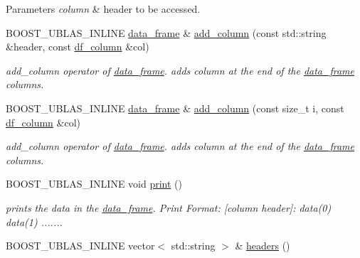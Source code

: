 \begin{DoxyParams}{Parameters}
{\em column} & header to be accessed. \\
\hline
\end{DoxyParams}
\begin{DoxyCompactItemize}
\item 
B\+O\+O\+S\+T\+\_\+\+U\+B\+L\+A\+S\+\_\+\+I\+N\+L\+I\+NE \hyperlink{classboost_1_1numeric_1_1ublas_1_1data__frame}{data\+\_\+frame} \& \hyperlink{classboost_1_1numeric_1_1ublas_1_1data__frame_a8f67aa27f8f340e8bfd42ce0f7713be0}{add\+\_\+column} (const std\+::string \&header, const \hyperlink{classboost_1_1numeric_1_1ublas_1_1df__column}{df\+\_\+column} \&col)
\begin{DoxyCompactList}\small\item\em add\+\_\+column operator of \hyperlink{classboost_1_1numeric_1_1ublas_1_1data__frame}{data\+\_\+frame}. adds column at the end of the \hyperlink{classboost_1_1numeric_1_1ublas_1_1data__frame}{data\+\_\+frame} columns. \end{DoxyCompactList}\item 
B\+O\+O\+S\+T\+\_\+\+U\+B\+L\+A\+S\+\_\+\+I\+N\+L\+I\+NE \hyperlink{classboost_1_1numeric_1_1ublas_1_1data__frame}{data\+\_\+frame} \& \hyperlink{classboost_1_1numeric_1_1ublas_1_1data__frame_a487209ed44384e2999d6a407160276e6}{add\+\_\+column} (const size\+\_\+t i, const \hyperlink{classboost_1_1numeric_1_1ublas_1_1df__column}{df\+\_\+column} \&col)
\begin{DoxyCompactList}\small\item\em add\+\_\+column operator of \hyperlink{classboost_1_1numeric_1_1ublas_1_1data__frame}{data\+\_\+frame}. adds column at the end of the \hyperlink{classboost_1_1numeric_1_1ublas_1_1data__frame}{data\+\_\+frame} columns. \end{DoxyCompactList}\item 
B\+O\+O\+S\+T\+\_\+\+U\+B\+L\+A\+S\+\_\+\+I\+N\+L\+I\+NE void \hyperlink{classboost_1_1numeric_1_1ublas_1_1data__frame_a2aae0aa66a1eadc3301b40cd104596c1}{print} ()\hypertarget{classboost_1_1numeric_1_1ublas_1_1data__frame_a2aae0aa66a1eadc3301b40cd104596c1}{}\label{classboost_1_1numeric_1_1ublas_1_1data__frame_a2aae0aa66a1eadc3301b40cd104596c1}

\begin{DoxyCompactList}\small\item\em prints the data in the \hyperlink{classboost_1_1numeric_1_1ublas_1_1data__frame}{data\+\_\+frame}. Print Format\+: \mbox{[}column header\mbox{]}\+: data(0) data(1) ....... \end{DoxyCompactList}\item 
B\+O\+O\+S\+T\+\_\+\+U\+B\+L\+A\+S\+\_\+\+I\+N\+L\+I\+NE vector$<$ std\+::string $>$ \& \hyperlink{classboost_1_1numeric_1_1ublas_1_1data__frame_aff5e603e988e7b710a3df6104d706c12}{headers} ()\hypertarget{classboost_1_1numeric_1_1ublas_1_1data__frame_aff5e603e988e7b710a3df6104d706c12}{}\label{classboost_1_1numeric_1_1ublas_1_1data__frame_aff5e603e988e7b710a3df6104d706c12}


\end{DoxyCompactItemize}
